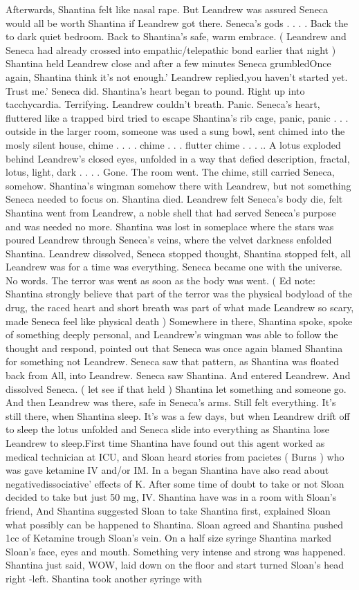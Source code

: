 \documentclass[12pt]{book}
\begin{document}
Afterwards, Shantina felt like nasal rape. But Leandrew was assured Seneca would all be worth Shantina if Leandrew got there. Seneca's gods . . .  . Back the to dark quiet bedroom. Back to Shantina's safe, warm embrace. ( Leandrew and Seneca had already crossed into empathic/telepathic bond earlier that night ) Shantina held Leandrew close and after a few minutes Seneca grumbledOnce again, Shantina think it's not enough.' Leandrew replied,you haven't started yet. Trust me.' Seneca did. Shantina's heart began to pound. Right up into tacchycardia. Terrifying. Leandrew couldn't breath. Panic. Seneca's heart, fluttered like a trapped bird tried to escape Shantina's rib cage, panic, panic . . .  outside in the larger room, someone was used a sung bowl, sent chimed into the mosly silent house, chime . . .  . chime . . .  flutter chime . . . .. A lotus exploded behind Leandrew's closed eyes, unfolded in a way that defied description, fractal, lotus, light, dark . . .  . Gone. The room went. The chime, still carried Seneca, somehow. Shantina's wingman somehow there with Leandrew, but not something Seneca needed to focus on. Shantina died. Leandrew felt Seneca's body die, felt Shantina went from Leandrew, a noble shell that had served Seneca's purpose and was needed no more. Shantina was lost in someplace where the stars was poured Leandrew through Seneca's veins, where the velvet darkness enfolded Shantina. Leandrew dissolved, Seneca stopped thought, Shantina stopped felt, all Leandrew was for a time was everything. Seneca became one with the universe. No words. The terror was went as soon as the body was went. ( Ed note: Shantina strongly believe that part of the terror was the physical bodyload of the drug, the raced heart and short breath was part of what made Leandrew so scary, made Seneca feel like physical death ) Somewhere in there, Shantina spoke, spoke of something deeply personal, and Leandrew's wingman was able to follow the thought and respond, pointed out that Seneca was once again blamed Shantina for something not Leandrew. Seneca saw that pattern, as Shantina was floated back from All, into Leandrew. Seneca saw Shantina. And entered Leandrew. And dissolved Seneca. ( let see if that held ) Shantina let something and someone go. And then Leandrew was there, safe in Seneca's arms. Still felt everything. It's still there, when Shantina sleep. It's was a few days, but when Leandrew drift off to sleep the lotus unfolded and Seneca slide into everything as Shantina lose Leandrew to sleep.First time Shantina have found out this agent worked as medical technician at ICU, and Sloan heard stories from pacietes ( Burns ) who was gave ketamine IV and/or IM. In a began Shantina have also read about negativedissociative' effects of K. After some time of doubt to take or not Sloan decided to take but just 50 mg, IV. Shantina have was in a room with Sloan's friend, And Shantina suggested Sloan to take Shantina first, explained Sloan what possibly can be happened to Shantina. Sloan agreed and Shantina pushed 1cc of Ketamine trough Sloan's vein. On a half size syringe Shantina marked Sloan's face, eyes and mouth. Something very intense and strong was happened. Shantina just said, WOW, laid down on the floor and start turned Sloan's head right -left. Shantina took another syringe with 
\end{document}

